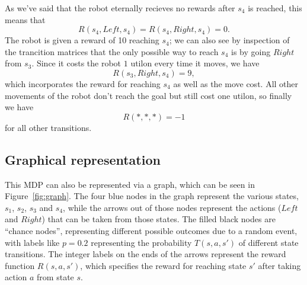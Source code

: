 \documentclass[a4paper]{article}
\begin{document}
As we've said that the robot eternally recieves no rewards after $s_4$ is reached,
this means that
\begin{equation*}
  R(s_4, Left, s_4) = R(s_4, Right, s_4) = 0 .
\end{equation*}
The robot is given a reward of 10 reaching $s_4$;
we can also see by inspection of the trancition matrices that the only possible
way to reach $s_4$ is by going $Right$ from $s_3$.
Since it costs the robot $1$ utilon every time it moves, we have
\begin{equation*}
  R(s_3, Right, s_4) = 9 ,
\end{equation*}
which incorporates the reward for reaching $s_4$ as well as the move cost.
All other movements of the robot don't reach the goal but still cost one
utilon, so finally we have
\begin{equation*}
  R(*, *, *) = -1
\end{equation*}
for all other transitions.

\subsection{Graphical representation}
This MDP can also be represented via a graph, which can be seen in
Figure~\ref{fig:graph}.
The four blue nodes in the graph represent the various states, $s_1$, $s_2$,
$s_3$ and $s_4$,
while the arrows out of those nodes represent the actions ($Left$ and $Right$)
that can be taken from those states.
The filled black nodes are ``chance nodes'', representing
different possible outcomes due to a random event,
with labels like $p=0.2$ representing the probability $T(s, a, s')$ of
different state transitions.
The integer labels on the ends of the arrows represent the reward function
$R(s, a, s')$, which specifies the reward for reaching state $s'$ after
taking action $a$ from state $s$.
\end{document}
